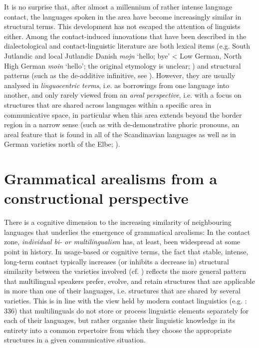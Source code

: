 \documentclass[output=paper]{langsci/langscibook}
\begin{document}
It is no surprise that, after almost a millennium of rather intense language contact, the languages spoken in the area have become increasingly similar in structural terms. This development has not escaped the attention of linguists either. Among the contact-induced innovations that have been described in the dialectological and contact-linguistic literature are both lexical items (e.g. South Jutlandic and local Jutlandic Danish \textit{mojn} ‘hello; bye’ < Low German, North High German \textit{moin} ‘hello’; the original etymology is unclear; \citealt{Pedersen.1995}) and structural patterns (such as the de-additive infinitive, see ). However, they are usually analysed in \textit{linguocentric terms}, i.e. as borrowings from one language into another, and only rarely viewed from an \textit{areal perspective}, i.e. with a focus on structures that are shared across languages within a specific area in communicative space, in particular when this area extends beyond the border region in a narrow sense (such as with de-demonstrative phoric pronouns, an areal feature that is found in all of the Scandinavian languages as well as in German varieties north of the Elbe; \citealt[121--124]{Hoder.2016a}).


\section{Grammatical arealisms from a constructional perspective} %
\label{sec:hoeder:3}

There is a cognitive dimension to the increasing similarity of neighbouring languages that underlies the emergence of grammatical arealisms: In the contact zone, \textit{individual bi- or multilingualism} has, at least, been widespread at some point in history. In usage-based or cognitive terms, the fact that stable, intense, long-term contact typically increases (or inhibits a decrease in) structural similarity between the varieties involved (cf. \citealt{Matras.2010}) reflects the more general pattern that multilingual speakers prefer, evolve, and retain structures that are applicable in more than one of their languages, i.e. structures that are shared by several varieties. This is in line with the view held by modern contact linguistics (e.g. \citealt{Matras.2020}: 336) that multilinguals do not store or process linguistic elements separately for each of their languages, but rather organise their linguistic knowledge in its entirety into a common repertoire from which they choose the appropriate structures in a given communicative situation.
\end{document}
